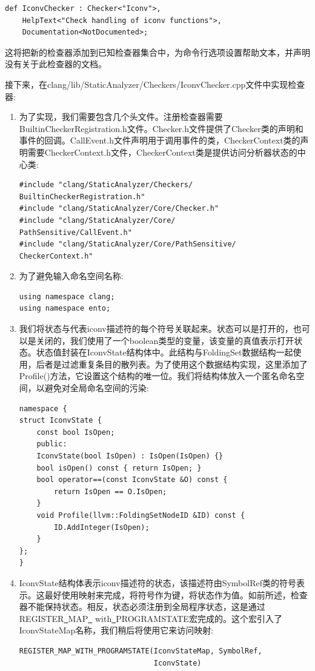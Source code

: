 \begin{lstlisting}[caption={}]
def IconvChecker : Checker<"Iconv">,
	HelpText<"Check handling of iconv functions">,
	Documentation<NotDocumented>;
\end{lstlisting}

这将把新的检查器添加到已知检查器集合中，为命令行选项设置帮助文本，并声明没有关于此检查器的文档。\par

接下来，在clang/lib/StaticAnalyzer/Checkers/IconvChecker.cpp文件中实现检查器:\par

\begin{enumerate}
\item 为了实现，我们需要包含几个头文件。注册检查器需要BuiltinCheckerRegistration.h文件。Checker.h文件提供了Checker类的声明和事件的回调。CallEvent.h文件声明用于调用事件的类，CheckerContext类的声明需要CheckerContext.h文件，CheckerContext类是提供访问分析器状态的中心类:
\begin{lstlisting}[caption={}]
#include "clang/StaticAnalyzer/Checkers/
BuiltinCheckerRegistration.h"
#include "clang/StaticAnalyzer/Core/Checker.h"
#include "clang/StaticAnalyzer/Core/
PathSensitive/CallEvent.h"
#include "clang/StaticAnalyzer/Core/PathSensitive/
CheckerContext.h"
\end{lstlisting}

\item 为了避免输入命名空间名称:
\begin{lstlisting}[caption={}]
using namespace clang;
using namespace ento;
\end{lstlisting}

\item 我们将状态与代表iconv描述符的每个符号关联起来。状态可以是打开的，也可以是关闭的，我们使用了一个boolean类型的变量，该变量的真值表示打开状态。状态值封装在IconvState结构体中。此结构与FoldingSet数据结构一起使用，后者是过滤重复条目的散列表。为了使用这个数据结构实现，这里添加了Profile()方法，它设置这个结构的唯一位。我们将结构体放入一个匿名命名空间，以避免对全局命名空间的污染:
\begin{lstlisting}[caption={}]
namespace {
struct IconvState {
	const bool IsOpen;
	public:
	IconvState(bool IsOpen) : IsOpen(IsOpen) {}
	bool isOpen() const { return IsOpen; }
	bool operator==(const IconvState &O) const {
		return IsOpen == O.IsOpen;
	}
	void Profile(llvm::FoldingSetNodeID &ID) const {
		ID.AddInteger(IsOpen);
	}
};
}
\end{lstlisting}

\item IconvState结构体表示iconv描述符的状态，该描述符由SymbolRef类的符号表示。这最好使用映射来完成，将符号作为键，将状态作为值。如前所述，检查器不能保持状态。相反，状态必须注册到全局程序状态，这是通过REGISTER\underline{~}MAP\underline{~} with\underline{~}PROGRAMSTATE宏完成的。这个宏引入了IconvStateMap名称，我们稍后将使用它来访问映射:
\begin{lstlisting}[caption={}]
REGISTER_MAP_WITH_PROGRAMSTATE(IconvStateMap, SymbolRef,
							   IconvState)
\end{lstlisting}


\end{enumerate}
